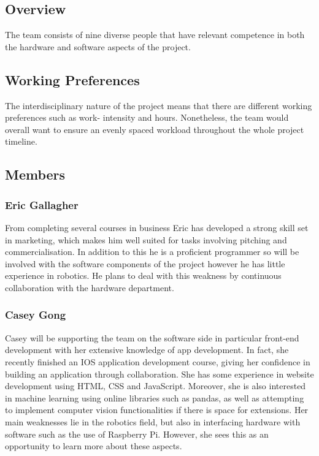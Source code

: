 \documentclass{article}
\begin{document}
\subsection{Overview}
The team consists of nine diverse people that have relevant competence in both the hardware and software aspects of the project.

\subsection{Working Preferences}
The interdisciplinary nature of the project means that there are different working preferences such as work- intensity and hours. Nonetheless, the team would overall want to ensure an evenly spaced workload throughout the whole project timeline.

\subsection{Members}
\subsubsection{Eric Gallagher}
From completing several courses in business Eric has developed a strong skill set in marketing, which makes him well suited for tasks involving pitching and commercialisation. In addition to this he is a proficient programmer so will be involved with the software components of the project however he has little experience in robotics. He plans to deal with this weakness by continuous collaboration with the hardware department.

\subsubsection{Casey Gong}
Casey will be supporting the team on the software side in particular front-end development with her extensive knowledge of app development. In fact, she recently finished an IOS application development course, giving her confidence in building an application through collaboration. She has some experience in website development using HTML, CSS and JavaScript. Moreover, she is also interested in machine learning using online libraries such as pandas, as well as attempting to implement computer vision functionalities if there is space for extensions. Her main weaknesses lie in the robotics field, but also in interfacing hardware with software such as the use of Raspberry Pi. However, she sees this as an opportunity to learn more about these aspects.
\end{document}
